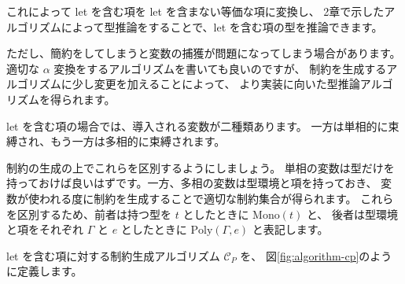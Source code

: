 これによって let を含む項を let を含まない等価な項に変換し、
2章で示したアルゴリズムによって型推論をすることで、let を含む項の型を推論できます。

ただし、簡約をしてしまうと変数の捕獲が問題になってしまう場合があります。
適切な $\alpha$ 変換をするアルゴリズムを書いても良いのですが、
制約を生成するアルゴリズムに少し変更を加えることによって、
より実装に向いた型推論アルゴリズムを得られます。

let を含む項の場合では、導入される変数が二種類あります。
一方は単相的に束縛され、もう一方は多相的に束縛されます。

制約の生成の上でこれらを区別するようにしましょう。
単相の変数は型だけを持っておけば良いはずです。一方、多相の変数は型環境と項を持っておき、
変数が使われる度に制約を生成することで適切な制約集合が得られます。
これらを区別するため、前者は持つ型を $t$ としたときに $\mathrm{Mono}(t)$ と、
後者は型環境と項をそれぞれ $\Gamma$ と $e$ としたときに $\mathrm{Poly}(\Gamma, e)$ と表記します。

let を含む項に対する制約生成アルゴリズム $\mathcal{C}_P$ を、
図\ref{fig:algorithm-cp}のように定義します。

